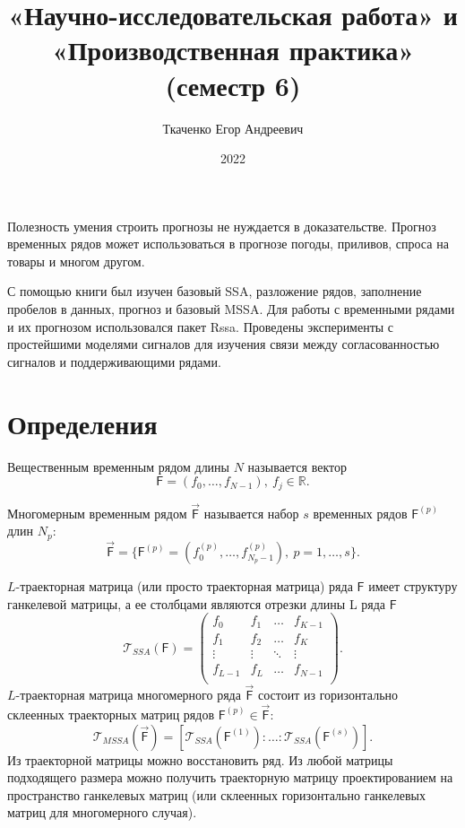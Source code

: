 \documentclass[specialist, substylefile = spbureport.rtx,
    subf,href,colorlinks=true, 12pt]{disser}
\title{«Научно-исследовательская работа» и «Производственная практика» (семестр 6)}
\author{Ткаченко Егор Андреевич}
\date{2022}
\newcommand{\T}{\mathcal{T}}
\newcommand{\F}{\mathsf{F}}
\newcommand{\MF}{\vec{\F}}
\begin{document}
    \maketitle
    \pagebreak
    \tableofcontents
    \pagebreak

    \intro
        Полезность умения строить прогнозы не нуждается в доказательстве. Прогноз временных рядов может использоваться в прогнозе погоды, приливов, спроса на товары и многом другом.
         
        С помощью книги \cite{SSA_with_R} был изучен базовый SSA, разложение рядов, заполнение пробелов в данных, прогноз и базовый MSSA. Для работы с временными рядами и их прогнозом использовался пакет Rssa. Проведены эксперименты с простейшими моделями сигналов для изучения связи между согласованностью сигналов и поддерживающими рядами.



    \section{Определения}
        Вещественным временным рядом длины $N$ называется вектор
        $$\F = (f_0, \dots, f_{N - 1}),\ f_j \in \mathbb{R}.$$

        Многомерным временным рядом $\MF$ называется набор $s$ временных рядов $\F^{(p)}$ длин $N_p$:
        $$\MF = \{\F^{(p)} = (f^{(p)}_0, \dots, f^{(p)}_{N_p - 1}),\ p=1, \dots, s\}.$$

        $L$-траекторная матрица (или просто траекторная матрица) ряда $\F$ имеет структуру ганкелевой матрицы, а ее столбцами являются отрезки длины L ряда $\F$
        $$\T_{SSA}(\F) =
        \begin{pmatrix}
            f_0     & f_1    & \dots  & f_{K-1} \\
            f_1     & f_2    & \dots  & f_K     \\
            \vdots  & \vdots & \ddots & \vdots  \\
            f_{L-1} & f_L    & \dots  & f_{N-1} \\
        \end{pmatrix}.$$
        $L$-траекторная матрица многомерного ряда $\MF$ состоит из горизонтально склеенных траекторных матриц рядов $\F^{(p)} \in \MF$:
        $$\T_{MSSA}(\MF) = [\T_{SSA}(\F^{(1)}): \dotso :\T_{SSA}(\F^{(s)})].$$
        Из траекторной матрицы можно восстановить ряд. Из любой матрицы подходящего размера можно получить траекторную матрицу проектированием на пространство ганкелевых матриц (или склеенных горизонтально ганкелевых матриц для многомерного случая).
\end{document}
